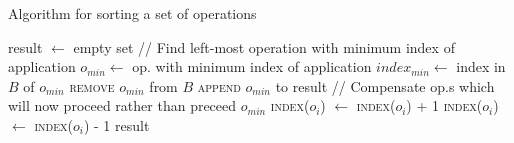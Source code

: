 
\begin{algorithm}[!ht]
  \caption{Algorithm for sorting a set of operations}
  \label{alg:opsort}
  \begin{algorithmic}[5]
      \State result $\gets$ empty set
        \State // Find left-most operation with minimum index of application
        \State $o_{min} \gets$ op. with minimum index of application
        \State $index_{min} \gets$ index in $B$ of $o_{min}$
        \State \textsc{remove} $o_{min}$ from $B$
        \State \textsc{append} $o_{min}$ to result
        \Statex
        \State // Compensate op.s which will now proceed rather than
        preceed $o_{min}$
                \State \textsc{index}($o_i$) $\gets$ \textsc{index}($o_i$) + 1
                \State \textsc{index}($o_i$) $\gets$ \textsc{index}($o_i$) - 1
          \EndIf
        \EndFor
       \EndWhile
      \Statex
      \State \Return result
    \EndFunction
  \end{algorithmic}
\end{algorithm}
